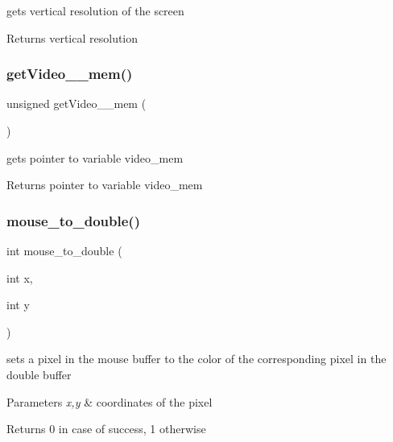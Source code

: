 gets vertical resolution of the screen 

\begin{DoxyReturn}{Returns}
vertical resolution 
\end{DoxyReturn}
\hypertarget{group__video__gr_gae633b6fb3ed1e90fdcbc7b4c65ffe2ef}{}\label{group__video__gr_gae633b6fb3ed1e90fdcbc7b4c65ffe2ef} 
\subsubsection{\texorpdfstring{get\+Video\+\_\+\+\_\+mem()}{getVideo\_\_mem()}}
{\footnotesize\ttfamily unsigned get\+Video\+\_\+\+\_\+mem (\begin{DoxyParamCaption}{ }\end{DoxyParamCaption})}



gets pointer to variable video\+\_\+mem 

\begin{DoxyReturn}{Returns}
pointer to variable video\+\_\+mem 
\end{DoxyReturn}
\hypertarget{group__video__gr_gaeae89e446fefdba5e72413ff38727f44}{}\label{group__video__gr_gaeae89e446fefdba5e72413ff38727f44} 
\subsubsection{\texorpdfstring{mouse\+\_\+to\+\_\+double()}{mouse\_to\_double()}}
{\footnotesize\ttfamily int mouse\+\_\+to\+\_\+double (\begin{DoxyParamCaption}\item[{int}]{x,  }\item[{int}]{y }\end{DoxyParamCaption})}



sets a pixel in the mouse buffer to the color of the corresponding pixel in the double buffer 


\begin{DoxyParams}{Parameters}
{\em x,y} & coordinates of the pixel \\
\hline
\end{DoxyParams}
\begin{DoxyReturn}{Returns}
0 in case of success, 1 otherwise 
\end{DoxyReturn}
\hypertarget{group__video__gr_gacbc2b21e05ad693bb6ed614f87329f05}{}\label{group__video__gr_gacbc2b21e05ad693bb6ed614f87329f05} 
